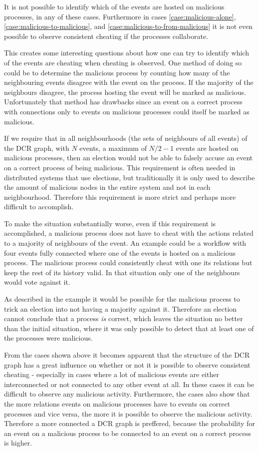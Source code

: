 	\newpar It is not possible to identify which of the events are hosted on malicious processes, in any of these cases. Furthermore in cases \ref{case:malicious-alone}, \ref{case:malicious-to-malicious}, and \ref{case:malicious-to-from-malicious} it is not even possible to observe consistent cheating if the processes collaborate.
	
	\newpar This creates some interesting questions about how one can try to identify which of the events are cheating when cheating is observed. One method of doing so could be to determine the malicious process by counting how many of the neighbouring events disagree with the event on the process. If the majority of the neighbours disagree, the process hosting the event will be marked as malicious. Unfortunately that method has drawbacks since an event on a correct process with connections only to events on malicious processes could itself be marked as malicious. 
	
	If we require that in all neighbourhoods (the sets of neighbours of all events) of the DCR graph, with $N$ events, a maximum of $N/2-1$ events are hosted on malicious processes, then an election would not be able to falsely accuse an event on a correct process of being malicious. This requirement is often needed in distributed systems that use elections, but traditionally it is only used to describe the amount of malicious nodes in the entire system and not in each neighbourhood. Therefore this requirement is more strict and perhaps more difficult to accomplish.
	
	\newpar To make the situation substantially worse, even if this requirement is accomplished, a malicious process does not have to cheat with the actions related to a majority of neighbours of the event. An example could be a workflow with four events fully connected where one of the events is hosted on a malicious process. The malicious process could consistently cheat with one its relations but keep the rest of its history valid. In that situation only one of the neighbours would vote against it. 
	
	As described in the example it would be possible for the malicious process to trick an election into not having a majority against it. Therefore an election cannot conclude that a process \textit{is} correct, which leaves the situation no better than the initial situation, where it was only possible to detect that at least one of the processes were malicious.
	
	\newpar From the cases shown above it becomes apparent that the structure of the DCR graph has a great influence on whether or not it is possible to observe consistent cheating - especially in cases where a lot of malicious events are either interconnected or not connected to any other event at all. In these cases it can be difficult to observe any malicious activity. Furthermore, the cases also show that the more relations events on malicious processes have to events on correct processes and vice versa, the more it is possible to observe the malicious activity. Therefore a more connected a DCR graph is preffered, because the probability for an event on a malicious process to be connected to an event on a correct process is higher.
	
